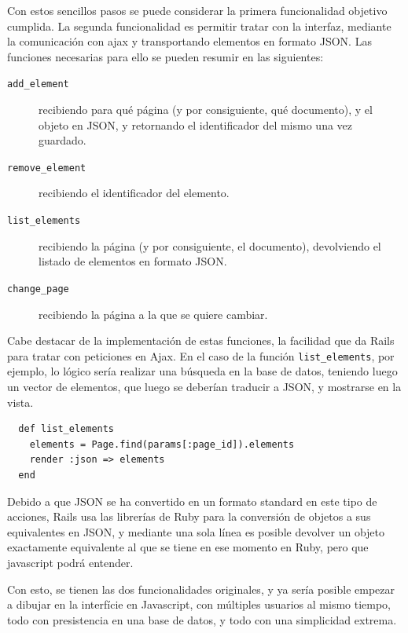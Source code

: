 Con estos sencillos pasos se puede considerar la primera funcionalidad objetivo cumplida. La segunda funcionalidad es permitir tratar con la interfaz, mediante la comunicación con ajax y transportando elementos en formato JSON. Las funciones necesarias para ello se pueden resumir en las siguientes:

\begin{description}
  \item[\texttt{add\_element}] recibiendo para qué página (y por consiguiente, qué documento), y el objeto en JSON, y retornando el identificador del mismo una vez guardado.
  \item[\texttt{remove\_element}] recibiendo el identificador del elemento.
  \item[\texttt{list\_elements}] recibiendo la página (y por consiguiente, el documento), devolviendo el listado de elementos en formato JSON.
  \item[\texttt{change\_page}] recibiendo la página a la que se quiere cambiar.
\end{description}

Cabe destacar de la implementación de estas funciones, la facilidad que da Rails para tratar con peticiones en Ajax. En el caso de la función \texttt{list\_elements}, por ejemplo, lo lógico sería realizar una búsqueda en la base de datos, teniendo luego un vector de elementos, que luego se deberían traducir a JSON, y mostrarse en la vista.

\begin{verbatim}
  def list_elements
    elements = Page.find(params[:page_id]).elements
    render :json => elements
  end
\end{verbatim}

Debido a que JSON se ha convertido en un formato standard en este tipo de acciones, Rails usa las librerías de Ruby para la conversión de objetos a sus equivalentes en JSON, y mediante una sola línea es posible devolver un objeto exactamente equivalente al que se tiene en ese momento en Ruby, pero que javascript podrá entender.

Con esto, se tienen las dos funcionalidades originales, y ya sería posible empezar a dibujar en la interfície en Javascript, con múltiples usuarios al mismo tiempo, todo con presistencia en una base de datos, y todo con una simplicidad extrema.


